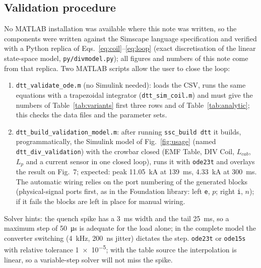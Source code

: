 \documentclass[11pt,a4paper]{article}
\newcommand{\code}[1]{\texttt{#1}}
\begin{document}
\subsection{Validation procedure}
\label{sec:valid}
No MATLAB installation was available where this note was written, so the components were written against the Simscape language specification \cite{simscape_lang} and verified with a Python replica of Eqs.~\eqref{eq:coil}--\eqref{eq:loop} (exact discretisation of the linear state-space model, \code{py/divmodel.py}); all figures and numbers of this note come from that replica. Two MATLAB scripts allow the user to close the loop:
\begin{enumerate}[label=(\arabic*)]
\item \code{dtt\_validate\_ode.m} (no Simulink needed): loads the CSV, runs the same equations with a trapezoidal integrator (\code{dtt\_sim\_coil.m}) and must give the numbers of Table~\ref{tab:variants} first three rows and of Table~\ref{tab:analytic}; this checks the data files and the parameter sets.
\item \code{dtt\_build\_validation\_model.m}: after running \code{ssc\_build dtt} it builds, programmatically, the Simulink model of Fig.~\ref{fig:usage} (named \code{dtt\_div\_validation}) with the crowbar closed (EMF Table, DIV Coil, $L_{cab}$, $L_p$ and a current sensor in one closed loop), runs it with \code{ode23t} and overlays the result on Fig.~7; expected: peak \SI{11.05}{\kilo\ampere} at \SI{139}{\milli\second}, \SI{4.33}{\kilo\ampere} at \SI{300}{\milli\second}. The automatic wiring relies on the port numbering of the generated blocks (physical-signal ports first, as in the Foundation library: left \code{e}, $p$; right \code{i}, $n$); if it fails the blocks are left in place for manual wiring.
\end{enumerate}
Solver hints: the quench spike has a \SI{3}{\milli\second} width and the tail \SI{25}{\milli\second}, so a maximum step of \SI{50}{\micro\second} is adequate for the load alone; in the complete model the converter switching (\SI{4}{\kilo\hertz}, \SI{200}{\nano\second} jitter) dictates the step. \code{ode23t} or \code{ode15s} with relative tolerance \num{1e-5}; with the table source the interpolation is linear, so a variable-step solver will not miss the spike.
\end{document}

